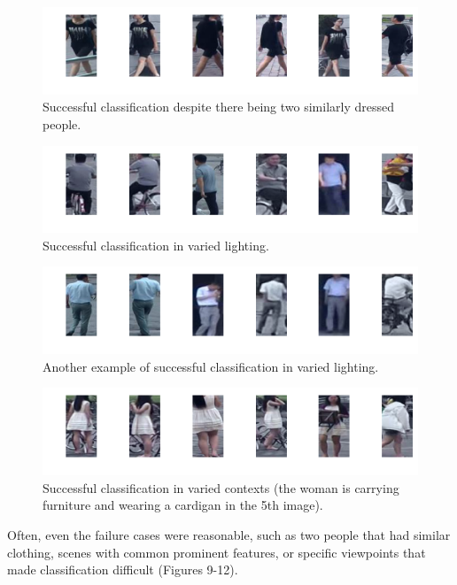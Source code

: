 \begin{figure}[H]
    \centering \includegraphics[width=0.8\columnwidth]{figures/person_reid/example11_accurate_despite_similarities.png}
    \caption{Successful classification despite there being two similarly dressed people.}
\end{figure}

\begin{figure}[H]
    \centering \includegraphics[width=0.8\columnwidth]{figures/person_reid/example8_different_context.png}
    \caption{Successful classification in varied lighting.}
\end{figure}

\begin{figure}[H]
    \centering \includegraphics[width=0.8\columnwidth]{figures/person_reid/example2_lighting.png}
    \caption{Another example of successful classification in varied lighting.}
\end{figure}

\begin{figure}[H]
    \centering \includegraphics[width=0.8\columnwidth]{figures/person_reid/example6_different_context.png}
    \caption{Successful classification in varied contexts (the woman is carrying furniture and wearing a cardigan in the 5th image).}
\end{figure}

Often, even the failure cases were reasonable, such as two people that had similar clothing, scenes with common prominent features, or specific viewpoints that made classification difficult (Figures 9-12).

